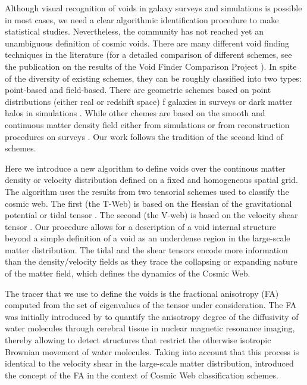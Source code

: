 \documentclass[a4,useAMS,usenatbib,usegraphicx]{mn2e}
\begin{document}
Although visual recognition of voids in galaxy surveys and simulations
is possible in most cases, we need a clear algorithmic identification
procedure to make statistical studies.
Nevertheless, the community has not reached yet an unambiguous
definition of cosmic voids.
There are many different void finding techniques in the literature
(for a detailed comparison of different schemes,  see the publication
on the results of the Void Finder Comparison Project \citet{Colberg08}).  
In spite of the diversity of existing schemes, they can be roughly
classified into two types: point-based and field-based. 
There are geometric schemes based on point distributions (either real or
redshift space)  f galaxies in surveys or dark matter halos in
simulations \citep{Kauffmann91, Muller00,    Gottlober03, Hoyle04,
  Brunino07,  Foster09, Micheletti14, Sutter14}. 
While other chemes are based on the smooth and continuous matter density
field either from simulations or from reconstruction procedures on
surveys \citep{Plionis02, Colberg05,  Shandarin06, Platen07,
  Neyrinck08, MunozCuartas11, Neyrinck13, Ricciardelli2013}. 
Our work follows the tradition of the second kind of schemes. 


Here we introduce a new algorithm to define voids over the continous
matter density or velocity distribution defined on a fixed and
homogeneous spatial grid.
The algorithm uses the results from two tensorial schemes used to
classify the cosmic web.
The first (the T-Web) is based on the Hessian of the gravitational potential or
tidal tensor \citep{Hahn07, Forero09}. 
The second (the V-web) is based on the velocity shear tensor
\citep{Hoffman12}. 
Our procedure allows for a description of a void internal structure
beyond a simple definition of a void as an underdense region in the
large-scale matter distribution. 
The tidal and the shear tensors
encode more information than the density/velocity fields as they trace
the collapsing or expanding nature of the matter field, which defines
the dynamics of the Cosmic Web.  


The tracer that we use to define the voids is the fractional
anisotropy (FA) computed from the set of eigenvalues of the tensor
under consideration. 
The FA was initially introduced by \citet{Basser95} to quantify the
anisotropy degree of the diffusivity of water molecules through
cerebral tissue in nuclear magnetic resonance imaging, thereby allowing to 
detect structures that restrict the otherwise isotropic Brownian movement 
of water molecules. Taking into account that this process is identical to 
the velocity shear in the large-scale matter distribution, 
\citet{Libeskind13} introduced the concept of the FA in the context of 
Cosmic Web classification schemes.
\end{document}
